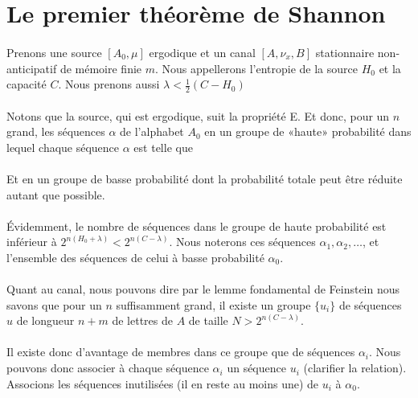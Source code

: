 \section{Le premier théorème de Shannon}

	\paragraph{}
	Prenons une source $[A_0,\mu]$ ergodique et un canal $[A,\nu_x,B]$ stationnaire non-anticipatif de mémoire finie $m$. 
	Nous appellerons l'entropie de la source $H_0$ et la capacité $C$. Nous prenons aussi $\lambda<\frac{1}{2}(C-H_0)$

	\paragraph{}
	Notons que la source, qui est ergodique, suit la propriété E. Et donc, pour un $n$ grand,  les séquences $\alpha$ de l'alphabet 
	$A_0$ en un groupe de «haute» probabilité dans lequel chaque séquence $\alpha$ est telle que
	
	\paragraph{}
	Et en un groupe de basse probabilité dont la probabilité totale peut être réduite autant que possible.

	\paragraph{}
	Évidemment, le nombre de séquences dans le groupe de haute probabilité est inférieur à $2^{n(H_0+\lambda)}<2^{n(C-\lambda)}$.
	Nous noterons ces séquences $\alpha_1,\alpha_2,\dots$, et l'ensemble des séquences de celui à basse probabilité $\alpha_0$.
	
	\paragraph{}
	Quant au canal, nous pouvons dire par le lemme fondamental de Feinstein nous savons que pour un $n$ suffisamment grand, 
	il existe un groupe $\{u_i\}$ de séquences $u$ de longueur $n+m$ de lettres de $A$ de taille $N > 2^{n(C-\lambda)}$.
	
	\paragraph{}
	Il existe donc d'avantage de membres dans ce groupe que de séquences $\alpha_i$. Nous pouvons donc associer à chaque séquence $\alpha_i$
	un séquence $u_i$ (clarifier la relation). Associons les séquences inutilisées (il en reste au moins une) de $u_i$ à $\alpha_0$.
	

